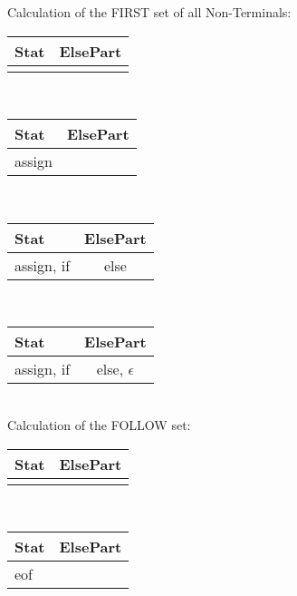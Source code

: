 \documentclass[11pt]{article} %
\begin{document}
\noindent Calculation of the FIRST set of all Non-Terminals:\\

\begin{tabular}{|p{2cm}|c|} \hline 
\textbf{Stat}
& \textbf{ElsePart} \\\hline 

& \\\hline 
\end{tabular} \\

\begin{tabular}{|p{2cm}|c|} \hline 
\textbf{Stat}
& \textbf{ElsePart} \\\hline 

assign
& \\\hline 
\end{tabular} \\

\begin{tabular}{|p{2cm}|c|} \hline 
\textbf{Stat}
& \textbf{ElsePart} \\\hline 

assign, if
& else \\\hline 
\end{tabular} \\

\begin{tabular}{|p{2cm}|c|} \hline 
\textbf{Stat}
& \textbf{ElsePart} \\\hline

assign, if
& else, $\epsilon$ \\\hline 
\end{tabular}\\

\noindent Calculation of the FOLLOW set:\\

\begin{tabular}{|p{2cm}|c|} \hline 
\textbf{Stat}
& \textbf{ElsePart} \\\hline 

& \\\hline 
\end{tabular} \\

\begin{tabular}{|p{2cm}|c|} \hline 
\textbf{Stat}
& \textbf{ElsePart} \\\hline

eof
& \\\hline 
\end{tabular} \\
\end{document}

